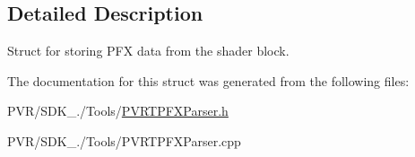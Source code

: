 \subsection{Detailed Description}
Struct for storing P\+F\+X data from the shader block. 



 

The documentation for this struct was generated from the following files\+:\begin{DoxyCompactItemize}
\item 
P\+V\+R/\+S\+D\+K\+\_./\+Tools/\hyperlink{_p_v_r_t_p_f_x_parser_8h}{P\+V\+R\+T\+P\+F\+X\+Parser.\+h}\item 
P\+V\+R/\+S\+D\+K\+\_./\+Tools/P\+V\+R\+T\+P\+F\+X\+Parser.\+cpp\end{DoxyCompactItemize}
